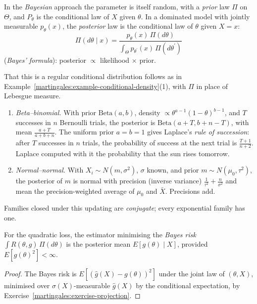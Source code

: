 \begin{definition}\label{statistics:definition-posterior}
In the \emph{Bayesian} approach the parameter is itself random, with a \emph{prior} law $\Pi$ on $\Theta$, and $P_\theta$ is the conditional law of $X$ given $\theta$. In a dominated model with jointly measurable $p_\theta(x)$, the
\emph{posterior} law is the conditional law of $\theta$ given $X = x$:
\[
\Pi(d\theta \mid x) = \frac{p_\theta(x)\,\Pi(d\theta)}{\int_\Theta p_{\theta^{\prime}}(x)\,\Pi(d\theta^{\prime})}
\]
(\emph{Bayes' formula}): posterior $\propto$ likelihood $\times$ prior.
\end{definition}

That this is a regular conditional distribution follows as in Example~\ref{martingales:example-conditional-density}(1), with $\Pi$ in place of Lebesgue measure.

\begin{example}\label{statistics:example-conjugate}
\begin{enumerate}
\item \emph{Beta--binomial.} With prior $\mathrm{Beta}(a, b)$, density $\propto\theta^{a-1}(1 - \theta)^{b-1}$, and $T$ successes in $n$ Bernoulli trials, the posterior is $\mathrm{Beta}(a + T, b + n - T)$, with mean
$\frac{a + T}{a + b + n}$. The uniform prior $a = b = 1$ gives Laplace's \emph{rule of succession}: after $T$ successes in $n$ trials, the probability of success at the next trial is $\frac{T + 1}{n + 2}$. Laplace computed with it the
probability that the sun rises tomorrow.
\item \emph{Normal--normal.} With $X_i \sim N(m, \sigma^2)$, $\sigma$ known, and prior $m \sim N(\mu_0, \tau^2)$, the posterior of $m$ is normal with precision (inverse variance) $\frac{1}{\tau^2} + \frac{n}{\sigma^2}$ and mean the
precision-weighted average of $\mu_0$ and $\bar X$. Precisions add.
\end{enumerate}
Families closed under this updating are \emph{conjugate}; every exponential family has one.
\end{example}

\begin{proposition}\label{statistics:proposition-bayes-estimator}
For the quadratic loss, the estimator minimising the \emph{Bayes risk} $\int R(\theta, \hat g)\,\Pi(d\theta)$ is the posterior mean $E[g(\theta) \mid X]$, provided $E[g(\theta)^2] < \infty$.
\end{proposition}

\begin{proof}
The Bayes risk is $E[(\hat g(X) - g(\theta))^2]$ under the joint law of $(\theta, X)$, minimised over $\sigma(X)$-measurable $\hat g(X)$ by the conditional expectation, by Exercise~\ref{martingales:exercise-projection}.
\end{proof}

